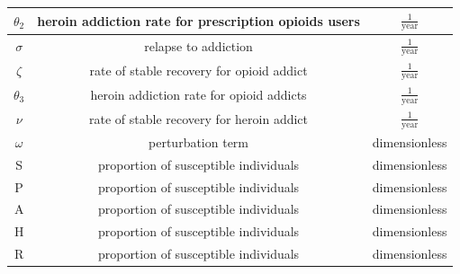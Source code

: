 \documentclass[12pt]{article}
\begin{document}
\begin{center}
\begin{tabular}{|c | c | c | }
\hline

$\theta_2$ &  heroin addiction rate for prescription opioids users & $\frac{1}{\text{year}}$  \\

\hline

$\sigma$ &  relapse to addiction & $\frac{1}{\text{year}}$  \\

\hline

$\zeta$ &  rate of stable recovery for opioid addict & $\frac{1}{\text{year}}$  \\

\hline

$\theta_3$ &   heroin addiction rate for opioid addicts & $\frac{1}{\text{year}}$\\

\hline

$\nu$ &  rate of stable recovery for heroin addict & $\frac{1}{\text{year}}$  \\

\hline

$\omega$ & perturbation term & \small dimensionless \\

\hline
S & proportion of susceptible individuals & \small dimensionless \\

\hline

P & proportion of susceptible individuals & \small dimensionless \\

\hline
A & proportion of susceptible individuals & \small dimensionless \\

\hline
H & proportion of susceptible individuals & \small dimensionless \\

\hline
R & proportion of susceptible individuals & \small dimensionless \\



 \hline

\end{tabular}

\end{center}
 





\pagebreak



 
\end{document}
